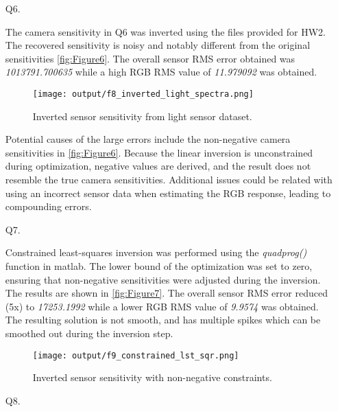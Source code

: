 \documentclass[12pt]{report}
\begin{document}
\begin{enumerate}
    \item[Q6.] 

    The camera sensitivity in Q6 was inverted using the files provided for HW2. The recovered sensitivity is noisy and 
    notably different from the original sensitivities \autoref{fig:Figure6}. The overall sensor RMS error obtained was 
    \emph{1013791.700635} while a high RGB RMS value of \emph{11.979092} was obtained.

    \begin{figure}[ht!]
        \centering
        \texttt{[image: output/f8\_inverted\_light\_spectra.png]}
        \caption{Inverted sensor sensitivity from light sensor dataset.}
        \label{fig:Figure6}
    \end{figure}

    \FloatBarrier

    Potential causes of the large errors include the non-negative camera sensitivities in \autoref{fig:Figure6}.
    Because the linear inversion is unconstrained during optimization, negative values are derived, and the result 
    does not resemble the true camera sensitivities. Additional issues could be related with using an incorrect 
    sensor data when estimating the RGB response, leading to compounding errors.

    \item[Q7.] 

    Constrained least-squares inversion was performed using the \emph{quadprog()} function in matlab. The lower 
    bound of the optimization was set to zero, ensuring that non-negative sensitivities were adjusted during the 
    inversion. The results are shown in \autoref{fig:Figure7}. The overall sensor RMS error reduced (5x) to 
    \emph{17253.1992} while a lower RGB RMS value of \emph{9.9574} was obtained. The resulting solution is not 
    smooth, and has multiple spikes which can be smoothed out during the inversion step.

    \begin{figure}[ht!]
        \centering
        \texttt{[image: output/f9\_constrained\_lst\_sqr.png]}
        \caption{Inverted sensor sensitivity with non-negative constraints.}
        \label{fig:Figure7}
    \end{figure}


    \item[Q8.] 


\end{enumerate}
\end{document}

